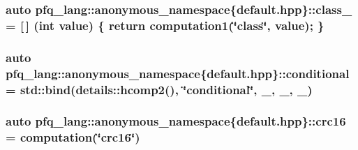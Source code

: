 \hypertarget{namespacepfq__lang_1_1anonymous__namespace_02default_8hpp_03_a27a683ef93570a66844e1a0106e6336a}{
\subsubsection[{class\-\_\-}]{\setlength{\rightskip}{0pt plus 5cm}auto pfq\-\_\-lang\-::anonymous\-\_\-namespace\{default.\-hpp\}\-::class\-\_\- = \mbox{[}$\,$\mbox{]} (int value) \{ return {\bf computation1}(\char`\"{}class\char`\"{}, value); \}}}\label{namespacepfq__lang_1_1anonymous__namespace_02default_8hpp_03_a27a683ef93570a66844e1a0106e6336a}
\hypertarget{namespacepfq__lang_1_1anonymous__namespace_02default_8hpp_03_a022d0075edf2fff575b93377aec0c228}{
\subsubsection[{conditional}]{\setlength{\rightskip}{0pt plus 5cm}auto pfq\-\_\-lang\-::anonymous\-\_\-namespace\{default.\-hpp\}\-::conditional = std\-::bind(details\-::hcomp2(), \char`\"{}conditional\char`\"{}, \-\_, \-\_, \-\_)}}\label{namespacepfq__lang_1_1anonymous__namespace_02default_8hpp_03_a022d0075edf2fff575b93377aec0c228}
\hypertarget{namespacepfq__lang_1_1anonymous__namespace_02default_8hpp_03_aaa12e1daf6bd2719a3b8592e673acf84}{
\subsubsection[{crc16}]{\setlength{\rightskip}{0pt plus 5cm}auto pfq\-\_\-lang\-::anonymous\-\_\-namespace\{default.\-hpp\}\-::crc16 = {\bf computation}(\char`\"{}crc16\char`\"{})}}\label{namespacepfq__lang_1_1anonymous__namespace_02default_8hpp_03_aaa12e1daf6bd2719a3b8592e673acf84}
